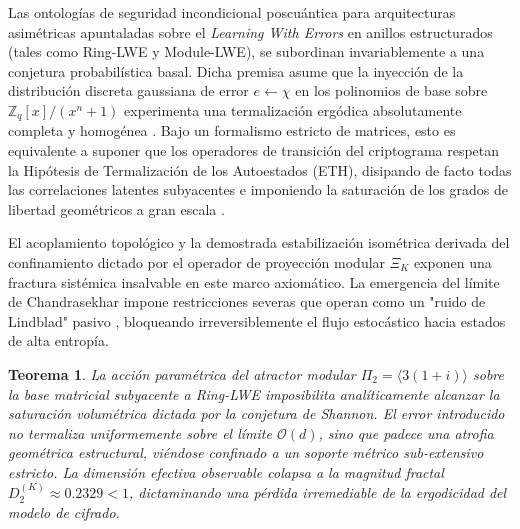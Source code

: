 \documentclass{article}
\numberwithin{equation}{section}
\theoremstyle{plain}
\newtheorem{teorema}{Teorema}[section]
\theoremstyle{definition}
\begin{document}
Las ontologías de seguridad incondicional poscuántica para arquitecturas asimétricas apuntaladas sobre el \textit{Learning With Errors} en anillos estructurados (tales como Ring-LWE y Module-LWE), se subordinan invariablemente a una conjetura probabilística basal. Dicha premisa asume que la inyección de la distribución discreta gaussiana de error $e \gets \chi$ en los polinomios de base sobre $\mathbb{Z}_q[x]/(x^n+1)$ experimenta una termalización ergódica absolutamente completa y homogénea \cite{Peikert2009, Regev2009}. Bajo un formalismo estricto de matrices, esto es equivalente a suponer que los operadores de transición del criptograma respetan la Hipótesis de Termalización de los Autoestados (ETH), disipando de facto todas las correlaciones latentes subyacentes e imponiendo la saturación de los grados de libertad geométricos a gran escala \cite{Pappalardi2023ETH}.

El acoplamiento topológico y la demostrada estabilización isométrica derivada del confinamiento dictado por el operador de proyección modular $\Xi_K$ exponen una fractura sistémica insalvable en este marco axiomático. La emergencia del límite de Chandrasekhar impone restricciones severas que operan como un "ruido de Lindblad" pasivo \cite{Khaymovich2021}, bloqueando irreversiblemente el flujo estocástico hacia estados de alta entropía.

\begin{teorema}
\label{teo:violacion_eth_lwe_uniqueqma}
La acción paramétrica del atractor modular $\Pi_2 = \langle 3(1+i) \rangle$ sobre la base matricial subyacente a Ring-LWE imposibilita analíticamente alcanzar la saturación volumétrica dictada por la conjetura de Shannon. El error introducido no termaliza uniformemente sobre el límite $\mathcal{O}(d)$, sino que padece una atrofia geométrica estructural, viéndose confinado a un soporte métrico sub-extensivo estricto. La dimensión efectiva observable colapsa a la magnitud fractal $D_2^{(K)} \approx 0.2329 < 1$, dictaminando una pérdida irremediable de la ergodicidad del modelo de cifrado.
\end{teorema}
\end{document}
